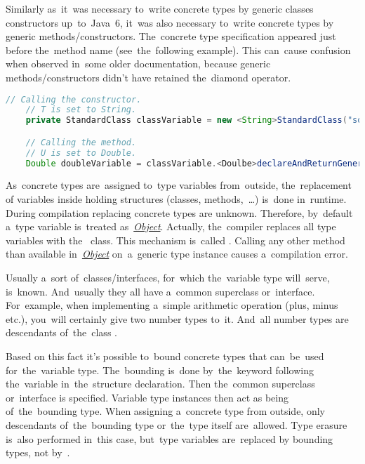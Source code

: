 \note Similarly as~it~was necessary to~write concrete types by generic classes constructors up~to~Java~6, it~was also necessary to~write concrete types by generic methods/constructors.
The~concrete type specification appeared just before the~method name (see~the~following example).
This can~cause confusion when observed in~some older documentation, because generic methods/constructors didn't have retained the~diamond operator.

\begin{lstlisting}[language=Java]
    // Calling the constructor.
    // T is set to String.
    private StandardClass classVariable = new <String>StandardClass("some string");

    // Calling the method.
    // U is set to Double.
    Double doubleVariable = classVariable.<Doulbe>declareAndReturnGenericType(3.14);
\end{lstlisting}

\label{javagenericsbound}
As~concrete types are~assigned to~type variables from~outside, the~replacement of variables inside holding structures (classes, \mbox{methods, \dots)} is~done in~runtime.
During compilation replacing concrete types are unknown.
Therefore, by~default a~type variable is~treated as~\hyperref[javaobject]{\textit{Object}}.
Actually, the~compiler replaces all type variables with the~ class.
This mechanism is~called .
Calling any other method than available in~\hyperref[javaobject]{\textit{Object}} on~a~generic type instance causes a~compilation error.

Usually a~sort of~classes/interfaces, for~which the~variable type will~serve, is~known.
And~usually they all have a~common superclass or~interface.
For~example, when implementing a~simple arithmetic operation (plus, minus etc.), you~will certainly give two number types to~it.
And~all number types are descendants of~the~class .

Based on this fact it's possible to~bound concrete types that can~be~used for~the~variable type.
The~bounding is~done by~the~keyword  following the~variable in~the~structure declaration.
Then the~common superclass or~interface is specified.
Variable type instances then act as being of~the~bounding type.
When assigning a~concrete type from outside, only descendants of~the~bounding type or~the~type itself are~allowed.
Type erasure is~also performed in~this case, but~type variables are~replaced by bounding types, not by~.

